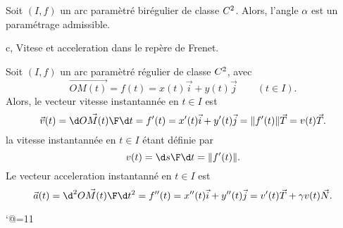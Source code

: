 \Propriete []  Soit $(I,f)$ un arc paramètré birégulier de classe $\sc C^2$. Alors, 
l'angle $\alpha$ est un paramétrage admissible. 



\Section c, Vitese et acceleration dans le repère de Frenet. 

\Propriete []  Soit $(I,f)$ un arc paramètré régulier de classe $\sc C^2$, avec 
$$
\vec{OM(t)}=f(t)=x(t)\vec i+y(t)\vec j\qquad (t\in I). 
$$
Alors, le vecteur vitesse instantannée en $t\in I$ est 
$$
\vec v(t)={\d\vec{OM(t)}\F \d t}=f'(t)=x'(t)\vec i+y'(t)\vec j=\|f'(t)\|\vec T=v(t)\vec T.
$$
la vitesse instantannée en $t\in I$ étant définie par 
$$
v(t)={\d s\F\d t}=\|f'(t)\|.
$$
Le vecteur acceleration instantanné en $t\in I$ est 
$$
\vec a(t)={\d^2\vec{OM(t)}\F \d t^2}=f''(t)=x''(t)\vec i+y''(t)\vec j=v'(t)\vec T+\gamma v(t)\vec N.
$$








\catcode`@=11\relax



